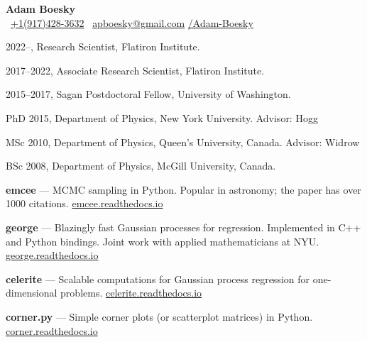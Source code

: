 \documentclass[11pt]{article}
\begin{document}
\thispagestyle{empty}\sloppy\sloppypar\raggedbottom

\begin{center}
    {\huge \textbf{Adam Boesky}}\\[0.5em]
    \faPhoneSquare \ \href{tel:+1-917-428-3632}{+1(917)\hspace{0.075cm}428-3632} \quad 
    \faEnvelope \ \href{mailto:apboesky@gmail.com}{apboesky@gmail.com} \quad
    \faGithub \href{https://github.com/Adam-Boesky}{/Adam-Boesky}
\end{center}

\begin{list}{}{\cvlist}
\item
2022--, Research Scientist, Flatiron Institute.
\item
2017--2022, Associate Research Scientist, Flatiron Institute.
\item
2015--2017, Sagan Postdoctoral Fellow, University of Washington.
\item
PhD 2015, Department of Physics, New York University. Advisor: Hogg
\item
MSc 2010, Department of Physics, Queen's University, Canada. Advisor: Widrow
\item
BSc 2008, Department of Physics, McGill University, Canada.
\end{list}

\begin{list}{}{\cvlist}

\end{list}

\begin{list}{}{\cvlist}

\item {\bf emcee} ---
    MCMC sampling in Python. Popular in astronomy;
    the paper has over 1000 citations.
    \url{emcee.readthedocs.io}

\item {\bf george} ---
    Blazingly fast Gaussian processes for regression. Implemented in C++ and
    Python bindings. Joint work with applied mathematicians at NYU.
    \url{george.readthedocs.io}

\item {\bf celerite} ---
    Scalable computations for Gaussian process regression for one-dimensional
    problems.
    \url{celerite.readthedocs.io}

\item {\bf corner.py} ---
    Simple corner plots (or scatterplot matrices) in Python.
    \url{corner.readthedocs.io}

\end{list}
\end{document}

